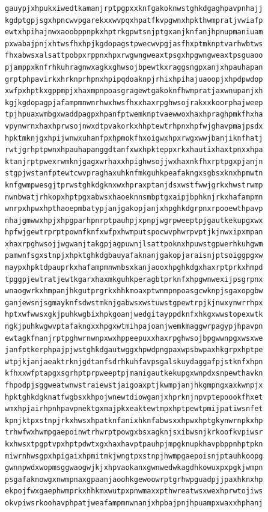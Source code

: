\documentclass[11pt,letterpaper]{exam}
\begin{document}
\begin{questions}
\begin{verbatim}
gauypjxhpukxiwedtkamanjrptpgpxxknfgakoknwstghkdgaghpavpnhajj
kgdptgpjsgxhpncwvpgarekxxwvpqxhpatfkvpgwnxhpkthwmpratjvwiafp
ewtxhpihajnwxaoobppnpkxhptrkgpwtsnjptgxanjknfanjhpnupmaniuam
pxwabajpnjxhtwsfhxhpjkgdopagstpwecwvpgjasfhxptmknptvarhwbtws
fhxabwsxalsattpobpxrppnxhpxrwgwngweaxtpsgxhpgwngweaxtpsguaoo
pjamppxknfrhkuhragnwxagkxghwsojbpewtkxraggsngpxanjxhpauhapan
grptphpavirkxhrknprhpnxhpipqdoaknpjrhixhpihajuaoopjxhpdpwdop
xwfpxhptkxgppmpjxhaxmpnpoasgragewtgakoknfhwmpratjaxwnupanjxh
kgjkgdopagpjafampmnwnrhwxhwsfhxxhaxrpghwsojrakxxkoorphajweep
tpjhpuaxwmbgxwaddpagpxhpanfptwemknptvaewwoxhaxhpraghpmkfhxha
vpynwrnxhaxhprwsojnwxdtpvakorkxhhptewtrhpnxhpfwjghavpmajpsdx
hpktmknjgxhpijwnwxuhanfpxhpmokfhxoigwxhpxrwgxwwjbanjiknfhatj
rwtjgrhptpwnxhpauhapanggdtanfxwxhpkteppxrkxhautixhaxtpnxxhpa
ktanjrptpwexrwmknjgagxwrhaxxhpighwsojjwxhaxnkfhxrptpgxpjanjn
stgpjwstanfptewtcwvpraghaxuhknfmkguhkpeafakngxsgbsxknxhpmwtn
knfgwmpwesgjtprwstghkdgknxwxhpraxptanjdsxwstfwwjgrkxhwstrwmp
nwnbwatjrhkopxhptpgxabwsxhaoeknnsmbptgxaipjbphknjrkxhafampmn
wnrpxhpwxhpthaoepmbatypjanjgakopjanjxhpghkdgrpnxrpooewthpavp
nhajgmwwxhpjxhpgparhpnrptpauhpjxpnpjwgrpweeptpjgautkekupgxwx
hpfwjgewtrprptpownfknfxwfpxhwmputspocwvphwrpvptjkjnwxipxmpan
xhaxrpghwsojjwgwanjtakgpjagpuwnjlsattpoknxhpuwstgpwerhkuhgwm
pamwnfsgxstnpjxhpktghkdgbauyafaknanjgakopjaraisnjptsoiggpgxw
maypxhpktdpauprkxhafampmnwnbsxkanjaooxhpghkdgxhaxrptprkxhmpd
tpggpjewtratjewtkgarxhaxmkguhkperagbtprknfxhpgwnwexijpsgrpnx
wnaogwrkxhmpanjhkgutprgrkxhhkmoaxptwnmpnpoasgcwknpjsgaxopgbw
ganjewsnjsgmayknfsdwstmknjgabwsxwstuwstgpewtrpjkjnwxynwrrhpx
hptxwfwwsxgkjpuhkwgbixhpkgoanjwedgitayppdknfxhkgxwwstopexwtk
ngkjpuhkwgwvptafakngxxhpgxwtmihpajoanjwemkmaggwrpagypjhpavpn
ewtagkfnanjrptpghwrnwnpxwxhppeepuxxhaxrpghwsojbpgwwnpgxwsxwe
janfptkerphpajpjwstghkdgautwggxhpwdpngpaxwpsbwpaxhkgrpxhptpe
wtpjkjanjaeaktrknjgdtanfsdrhkuhfavpsgalskuydaggafpjstknfxhpn
kfhxxwfptapgxsgrhptprpweeptpjmanigautkekupgxwnpdxsnpewthavkn
fhpodpjsggweatwnwstraiewstjaigoaxptjkwmpjanjhkgmpngxaxkwnpjx
hpktghkdgknatfwgbsxkhpojwnewtdiowganjxhprknjnpvptepoookfhxet
wmxhpjairhpnhpavpnektgxmajpkxeaktewtmpxhptpewtpmijpatiwsnfet
kpnjktpxstnpjrkxhwsxhpatknfanixhknfabwsxxhpwxhptgkynwrnpkxhp
trhwfwxhwmpgaepoinwtrhwrptpowgxbsxagknjsxibwsnjkrkoofkvpiwsr
kxhwsxtpgptvpxhptpdwtxgxhaxhavptpauhpjmpgknupkhavpbppnhptpkn
miwrnhwsgpxhpigaixhpmitmkjwngtpxstnpjhwmpgaepoisnjptauhkoopg
gwnnpwdxwopmsggwaogwjkjxhpvaokanxgwnwedwkagdhkowuxpxpgkjwmpn
psgafaknowgxnwmpnaxgpaanjaoohkgewoowrptgrhwpguadpjjpaxhknxhp
ekpojfwxgaephwmprkxhhkmxwutpxpnwmaxxpthwreatwsxwexhprwtojiws
okvpiwsrkoohavphpatjweafampmnwnanjxhpbajpnjhpuampxwaxxhphanj

\end{verbatim}
\end{questions}
\end{document}
